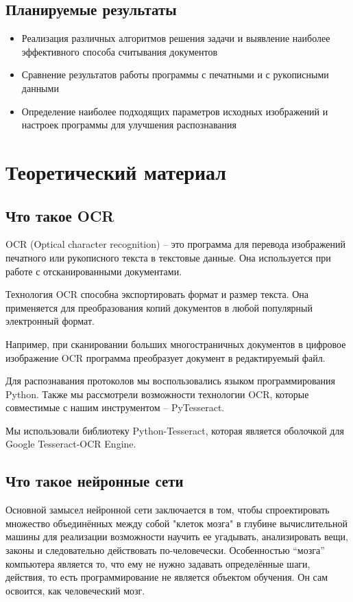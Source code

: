 \documentclass[a4paper, 12pt]{report}
\begin{document}
\section{Планируемые результаты}
\begin{itemize}
  \item Реализация различных алгоритмов решения задачи и выявление наиболее эффективного способа считывания документов 
  \item Сравнение результатов работы программы с печатными и с рукописными данными
  \item Определение наиболее подходящих параметров исходных изображений и настроек программы для улучшения распознавания 
\end{itemize}

\chapter{Теоретический материал}

\section{Что такое OCR}

OCR (Optical character recognition) – это программа для перевода изображений печатного или рукописного текста в текстовые данные. Она используется при работе с отсканированными документами.

Технология OCR способна экспортировать формат и размер текста. Она применяется для преобразования копий документов в любой популярный электронный формат. 

Например, при сканировании больших многостраничных документов в цифровое изображение OCR программа преобразует документ в редактируемый файл.

Для распознавания протоколов мы воспользовались языком программирования Python. Также мы рассмотрели возможности технологии OCR, которые совместимые с нашим инструментом – PyTesseract.

Мы использовали библиотеку Python-Tesseract, которая является оболочкой для Google Tesseract-OCR Engine.

\section{Что такое нейронные сети}
Основной замысел нейронной сети заключается в том, чтобы спроектировать множество объединённых между собой "клеток мозга" в глубине вычислительной машины для реализации возможности научить ее угадывать, анализировать вещи, законы и следовательно действовать по-человечески. Особенностью “мозга” компьютера является то, что ему не нужно задавать определённые шаги, действия, то есть программирование не является объектом обучения. Он сам освоится, как человеческий мозг.
\end{document}
